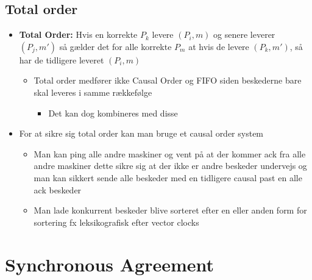 \documentclass[a4, english]{article}
\begin{document}
\subsection{Total order}
\begin{itemize}
	\item \textbf{Total Order:} Hvis en korrekte $P_k$ levere $(P_i,m)$ og senere leverer $(P_j,m')$ så gælder det for alle korrekte $P_m$ at hvis de levere $(P_k,m')$, så har de tidligere leveret $(P_i,m)$
  \begin{itemize}
    \item Total order medfører ikke Causal Order og FIFO siden beskederne bare skal leveres i samme rækkefølge
    \begin{itemize}
    	\item Det kan dog kombineres med disse
    \end{itemize}
  \end{itemize}
  \item For at sikre sig total order kan man bruge et causal order system 
  \begin{itemize}
    \item Man kan ping alle andre maskiner og vent på at der kommer ack fra alle andre maskiner dette sikre sig at der ikke er andre beskeder undervejs og man kan sikkert sende alle beskeder med en tidligere causal past en alle ack beskeder 
    \item Man lade konkurrent beskeder blive sorteret efter en eller anden form for sortering fx  leksikografisk efter vector clocks
  \end{itemize}

\end{itemize}
\newpage

\section{Synchronous Agreement}
\end{document}
